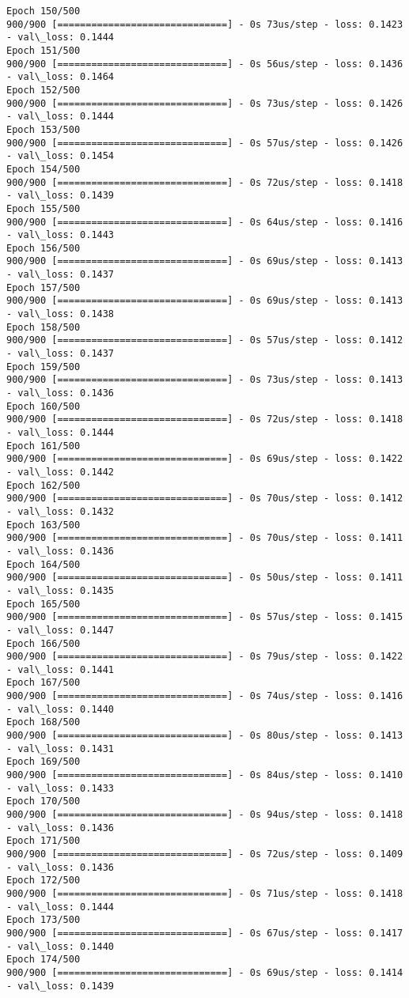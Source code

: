 \documentclass[11pt]{article}
\begin{document}
\begin{Verbatim}[commandchars=\\\{\}]
Epoch 150/500
900/900 [==============================] - 0s 73us/step - loss: 0.1423 - val\_loss: 0.1444
Epoch 151/500
900/900 [==============================] - 0s 56us/step - loss: 0.1436 - val\_loss: 0.1464
Epoch 152/500
900/900 [==============================] - 0s 73us/step - loss: 0.1426 - val\_loss: 0.1444
Epoch 153/500
900/900 [==============================] - 0s 57us/step - loss: 0.1426 - val\_loss: 0.1454
Epoch 154/500
900/900 [==============================] - 0s 72us/step - loss: 0.1418 - val\_loss: 0.1439
Epoch 155/500
900/900 [==============================] - 0s 64us/step - loss: 0.1416 - val\_loss: 0.1443
Epoch 156/500
900/900 [==============================] - 0s 69us/step - loss: 0.1413 - val\_loss: 0.1437
Epoch 157/500
900/900 [==============================] - 0s 69us/step - loss: 0.1413 - val\_loss: 0.1438
Epoch 158/500
900/900 [==============================] - 0s 57us/step - loss: 0.1412 - val\_loss: 0.1437
Epoch 159/500
900/900 [==============================] - 0s 73us/step - loss: 0.1413 - val\_loss: 0.1436
Epoch 160/500
900/900 [==============================] - 0s 72us/step - loss: 0.1418 - val\_loss: 0.1444
Epoch 161/500
900/900 [==============================] - 0s 69us/step - loss: 0.1422 - val\_loss: 0.1442
Epoch 162/500
900/900 [==============================] - 0s 70us/step - loss: 0.1412 - val\_loss: 0.1432
Epoch 163/500
900/900 [==============================] - 0s 70us/step - loss: 0.1411 - val\_loss: 0.1436
Epoch 164/500
900/900 [==============================] - 0s 50us/step - loss: 0.1411 - val\_loss: 0.1435
Epoch 165/500
900/900 [==============================] - 0s 57us/step - loss: 0.1415 - val\_loss: 0.1447
Epoch 166/500
900/900 [==============================] - 0s 79us/step - loss: 0.1422 - val\_loss: 0.1441
Epoch 167/500
900/900 [==============================] - 0s 74us/step - loss: 0.1416 - val\_loss: 0.1440
Epoch 168/500
900/900 [==============================] - 0s 80us/step - loss: 0.1413 - val\_loss: 0.1431
Epoch 169/500
900/900 [==============================] - 0s 84us/step - loss: 0.1410 - val\_loss: 0.1433
Epoch 170/500
900/900 [==============================] - 0s 94us/step - loss: 0.1418 - val\_loss: 0.1436
Epoch 171/500
900/900 [==============================] - 0s 72us/step - loss: 0.1409 - val\_loss: 0.1436
Epoch 172/500
900/900 [==============================] - 0s 71us/step - loss: 0.1418 - val\_loss: 0.1444
Epoch 173/500
900/900 [==============================] - 0s 67us/step - loss: 0.1417 - val\_loss: 0.1440
Epoch 174/500
900/900 [==============================] - 0s 69us/step - loss: 0.1414 - val\_loss: 0.1439

\end{Verbatim}
\end{document}
